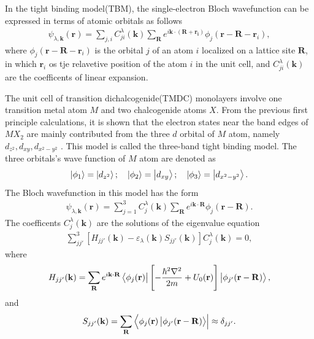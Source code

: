 \documentclass{report}
\newcommand{\f}[2]{\dfrac{#1}{#2}}
\begin{document}
In the tight binding model(TBM), the single-electron Bloch wavefunction can be expressed in terms of atomic orbitals as follows
\begin{gather}
	\psi_{\lambda,\mathbf{k}}(\mathbf{r}) = \sum_{j,i} C_{ji}^{\lambda}(\mathbf{k}) \sum_{\mathbf{R}} e^{i\mathbf{k}\cdot(\mathbf{R+\mathbf{r}_{i}})} \phi_{j}(\mathbf{r} - \mathbf{R} - \mathbf{r}_{i}),
\end{gather}
where $\phi_{j}(\mathbf{r} - \mathbf{R} - \mathbf{r}_{i})$ is the orbital $j$ of an atom $i$ localized on a lattice site $\mathbf{R}$, in which $\mathbf{r}_{i}$ os tje relavetive position of the atom $i$ in the unit cell, and $C_{ji}^{\lambda}(\mathbf{k})$ are the coefficents of linear expansion.

The unit cell of transition dichalcogenide(TMDC) monolayers involve one transition metal atom $M$ and two chalcogenide atoms $X$. From the previous first principle calculations, it is shown that the electron states near the band edges of $MX_{2}$ are mainly contributed from the three $d$ orbital of $M$ atom, namely $d_{z^{2}},d_{xy},d_{x^{2}-y^{2}}$ \cite{PhysRevB.88.085433}. This model is called the three-band tight binding model. The three orbitals's wave function of $M$ atom are denoted as
\begin{gather}
	\ket{\phi_{1}} = \ket{d_{z^{2}}} ; \quad \ket{\phi_{2}} = \ket{d_{xy}} ; \quad \ket{\phi_{3}} = \ket{d_{x^{2} - y^{2}}}.
\end{gather}
The Bloch wavefunction in this model has the form
\begin{gather}
	\psi_{\lambda,\mathbf{k}}(\mathbf{r}) = \sum_{j=1}^{3} C_{j}^{\lambda}(\mathbf{k}) \sum_{\mathbf{R}} e^{i \mathbf{k \cdot R}} \phi_{j}(\mathbf{r} - \mathbf{R}).
\end{gather}
The coefficents $C_{j}^{\lambda}(\mathbf{k})$ are the solutions of the eigenvalue equation
\begin{gather}
	\sum_{jj'}^{3} \left[H_{jj'}(\mathbf{k}) - \varepsilon_{\lambda}(\mathbf{k}) S_{jj'}(\mathbf{k})\right] C_{j}^{\lambda}(\mathbf{k}) = 0,
\end{gather}
where
\begin{gather}
	H_{jj'}(\mathbf{k}) = \sum_{\mathbf{R}} e^{i \mathbf{k \cdot R}} \bra{\phi_{j}(\mathbf{r})} \left[-\f{\hbar^{2} \nabla^{2}}{2m} + U_{0}(\mathbf{r})\right] \ket{\phi_{j'}(\mathbf{r - R})},
\end{gather}
and 
\begin{gather}
	S_{jj'}(\mathbf{k}) = \sum_{\mathbf{R}} \bra{\phi_{j}(\mathbf{r}) \ket{\phi_{j'}(\mathbf{r - R})}}\approx \delta_{jj'}.
\end{gather}
\end{document}
